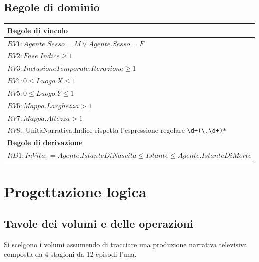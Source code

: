 \documentclass{article}
\begin{document}
\subsection{Regole di dominio}
\begin{center}\begin{tabular}{ |l| }
		\hline
		\textbf{Regole di vincolo}                                                          \\
		\hline
		$ RV1: Agente.Sesso = M \lor Agente.Sesso = F $                                     \\
		\hline
		$RV2: Fase.Indice \geq 1 $                                                          \\
		\hline
		$RV3: InclusioneTemporale.Iterazione \geq 1 $                                       \\
		\hline
		$RV4: 0 \leq Luogo.X \leq 1 $                                                       \\
		\hline
		$RV5: 0 \leq Luogo.Y \leq 1 $                                                       \\
		\hline
		$RV6: Mappa.Larghezza > 1 $                                                         \\
		\hline
		$RV7: Mappa.Altezza > 1 $                                                           \\
		\hline
		$RV8:$ UnitàNarrativa.Indice rispetta l'espressione regolare \verb|\d+(\.\d+)*| \\
		\hline
		\textbf{Regole di derivazione}                                                      \\
		\hline
		$RD1: InVita:  = Agente.IstanteDiNascita \leq Istante \leq Agente.IstanteDiMorte$   \\
		\hline
	\end{tabular}\end{center}

\section{Progettazione logica}

\subsection{Tavole dei volumi e delle operazioni}

Si scelgono i volumi assumendo di tracciare una produzione narrativa
televisiva composta da 4 stagioni da 12 episodi l'una.
\end{document}
